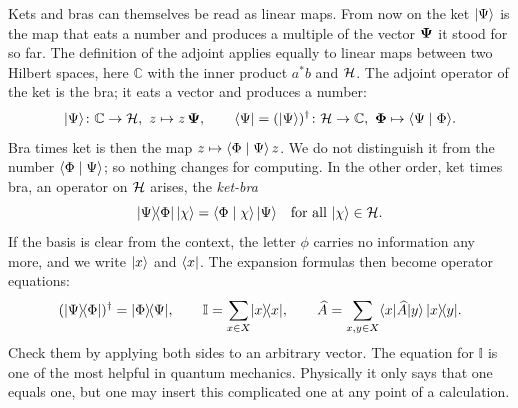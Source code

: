 Kets and bras can themselves be read as linear maps. From now on the ket $\lvert \Psi \rangle$ is the map that eats a number and produces a multiple of the vector $\boldsymbol{\Psi}$ it stood for so far. The definition of the adjoint applies equally to linear maps between two Hilbert spaces, here $\mathbb{C}$ with the inner product $a^*b$ and $\mathcal{H}$. The adjoint operator of the ket is the bra; it eats a vector and produces a number:
\begin{equation}
	\lvert \Psi \rangle\colon \mathbb{C} \to \mathcal{H},\ z \mapsto z\,\boldsymbol{\Psi}, \qquad
	\langle \Psi \rvert = (\lvert \Psi \rangle)^{\dagger}\colon \mathcal{H} \to \mathbb{C},\ \boldsymbol{\Phi} \mapsto \langle \Psi \mid \Phi \rangle.
\end{equation}
Bra times ket is then the map $z \mapsto \langle \Phi \mid \Psi \rangle\,z$. We do not distinguish it from the number $\langle \Phi \mid \Psi \rangle$; so nothing changes for computing. In the other order, ket times bra, an operator on $\mathcal{H}$ arises, the \emph{ket-bra}
\begin{equation}
	\lvert \Psi \rangle\!\langle \Phi \rvert\,\lvert \chi \rangle = \langle \Phi \mid \chi \rangle\,\lvert \Psi \rangle \quad \text{for all } \lvert \chi \rangle\in\mathcal{H}.
\end{equation}
If the basis is clear from the context, the letter $\phi$ carries no information any more, and we write $\lvert x \rangle$ and $\langle x \rvert$. The expansion formulas then become operator equations:
\begin{equation}
	(\lvert \Psi \rangle\!\langle \Phi \rvert)^{\dagger} = \lvert \Phi \rangle\!\langle \Psi \rvert, \qquad
	\mathbb{I} = \sum_{x\in X}\lvert x \rangle\!\langle x \rvert, \qquad
	\widehat{A} = \sum_{x,y\in X}\langle x \rvert \widehat{A} \lvert y \rangle\,\lvert x \rangle\!\langle y \rvert.
\end{equation}
Check them by applying both sides to an arbitrary vector. The equation for $\mathbb{I}$ is one of the most helpful in quantum mechanics. Physically it only says that one equals one, but one may insert this complicated one at any point of a calculation.

